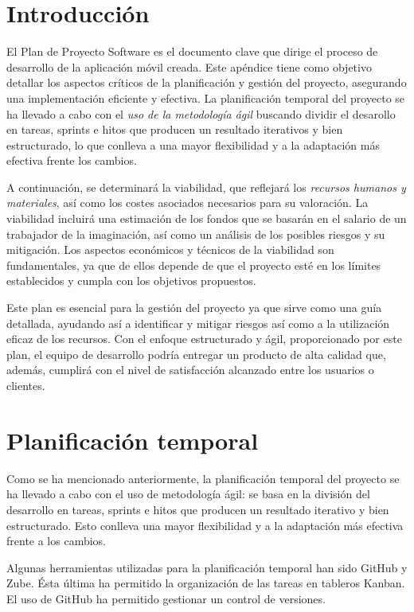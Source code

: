 
\section{Introducción}
El Plan de Proyecto Software es el documento clave que dirige el proceso de desarrollo de la aplicación móvil creada. Este apéndice tiene como objetivo detallar los aspectos críticos de la planificación y gestión del proyecto, asegurando una implementación eficiente y efectiva.
La planificación temporal del proyecto se ha llevado a cabo con el \emph{uso de la metodología ágil} buscando dividir el desarollo en tareas, sprints e hitos que producen un resultado iterativos y bien estructurado, lo que conlleva a una mayor flexibilidad y a la adaptación más efectiva frente los cambios. 

A continuación, se determinará la viabilidad, que reflejará los \emph{recursos humanos y materiales}, así como los costes asociados necesarios para su valoración. La viabilidad incluirá una estimación de los fondos que se basarán en el salario de un trabajador de la imaginación, así como un análisis de los posibles riesgos y su mitigación. Los aspectos económicos y técnicos de la viabilidad son fundamentales, ya que de ellos depende de que el proyecto esté en los límites establecidos y cumpla con los objetivos propuestos.

Este plan es esencial para la gestión del proyecto ya que sirve como una guía detallada, ayudando así a identificar y mitigar riesgos así como a la utilización eficaz de los recursos. Con el enfoque estructurado y ágil, proporcionado por este plan, el equipo de desarrollo podría entregar un producto de alta calidad que, además, cumplirá con el nivel de satisfacción alcanzado entre los usuarios o clientes. 
\section{Planificación temporal}
 Como se ha mencionado anteriormente, la planificación temporal del proyecto se ha llevado a cabo con el uso de metodología ágil: se basa en la división del desarrollo en tareas, sprints e hitos que producen un resultado iterativo y bien estructurado. Esto conlleva una mayor flexibilidad y a la adaptación más efectiva frente a los cambios.

 Algunas herramientas utilizadas para la planificación temporal han sido GitHub y Zube. Ésta última ha permitido la organización de las tareas en tableros Kanban. El uso de GitHub ha permitido gestionar un control de versiones.

